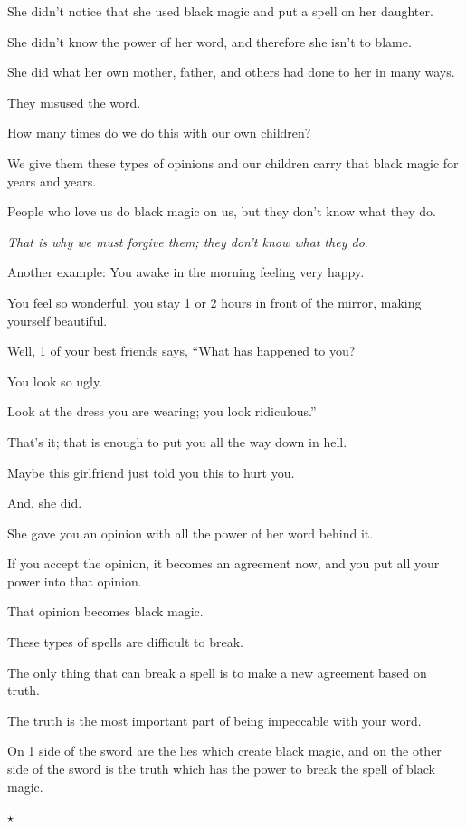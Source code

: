 \documentclass{article}
\numberwithin{equation}{section}
\begin{document}
She didn't notice that she used black magic and put a spell on her daughter.

She didn't know the power of her word, and therefore she isn't to blame.

She did what her own mother, father, and others had done to her in many ways.

They misused the word.

%
How many times do we do this with our own children?

We give them these types of opinions and our children carry that black magic for years and years.

People who love us do black magic on us, but they don't know what they do.

\textit{That is why we must forgive them; they don't know what they do}.

%
Another example: You awake in the morning feeling very happy.

You feel so wonderful, you stay 1 or 2 hours in front of the mirror, making yourself beautiful.

Well, 1 of your best friends says, ``What has happened to you?

You look so ugly.

Look at the dress you are wearing; you look ridiculous.''

That's it; that is enough to put you all the way down in hell.

Maybe this girlfriend just told you this to hurt you.

And, she did.

She gave you an opinion with all the power of her word behind it.

If you accept the opinion, it becomes an agreement now, and you put all your power into that opinion.

That opinion becomes black magic.

%
These types of spells are difficult to break.

The only thing that can break a spell is to make a new agreement based on truth.

The truth is the most important part of being impeccable with your word.

On 1 side of the sword are the lies which create black magic, and on the other side of the sword is the truth which has the power to break the spell of black magic.

\begin{center}
    $\star$
\end{center}
\end{document}

